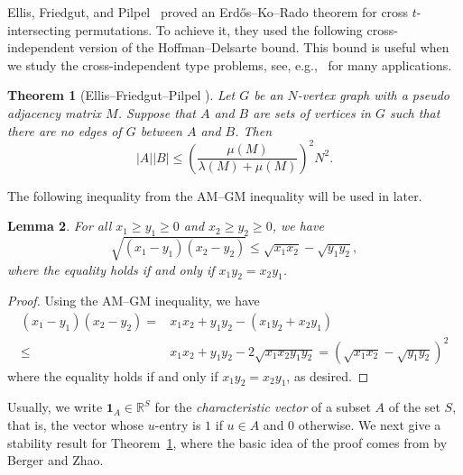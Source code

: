 \documentclass[11pt]{article}
\numberwithin{equation}{section}
\newtheorem{theorem}{Theorem}[section]
\newtheorem{lemma}[theorem]{Lemma}
\def\RR{\mathbb{R}}
\def\1{\mathbf{1}}
\begin{document}



Ellis, Friedgut, and Pilpel~\cite{EllisJAMS}
proved an Erd\H{o}s--Ko--Rado theorem for cross $t$-intersecting permutations.
To achieve it, they used the following cross-independent version of the Hoffman--Delsarte bound. %
This bound is useful when we study the cross-independent type problems,
see, e.g.,~\cite{Tokushige} for many applications.




\begin{theorem}[Ellis--Friedgut--Pilpel \cite{EllisJAMS}]\label{CrossHDbound}
Let $G$ be an $N$-vertex graph with a pseudo adjacency matrix $M$.
Suppose that $A$ and $B$ are sets of vertices in $G$ such
that there are no edges of $G$ between $A$ and $B$.
Then
$$ |A||B| \leq \left(\frac{\mu (M)}{\lambda (M)+\mu (M)}\right)^2N^2.$$
\end{theorem}



The following inequality from the AM--GM inequality will be used in later.

\begin{lemma}\label{specialAGinq}
For all $x_1\geq y_1\geq 0$ and $x_2\geq y_2\geq 0$, we have
$$\sqrt{(x_1-y_1)(x_2-y_2)}\leq \sqrt{x_1x_2}-\sqrt{y_1y_2},$$
where the equality holds if and only if $x_1y_2=x_2y_1$.
\end{lemma}
\begin{proof}
Using the AM--GM inequality, we have
\begin{align*}
(x_1-y_1)(x_2-y_2)=&x_1x_2 +y_1y_2- (x_1y_2+x_2 y_1)\\
\leq &x_1x_2 +y_1y_2-2\sqrt{x_1x_2y_1y_2}
= (\sqrt{x_1x_2}-\sqrt{y_1y_2})^2
\end{align*}
where the equality holds if and only if $x_1y_2=x_2y_1$, as desired.
\end{proof}



Usually, we write $\1_A\in \RR^S$ for the {\em characteristic vector} of a subset $A$  of the set $S$, that is, the vector whose $u$-entry is $1$ if $u\in A$ and $0$ otherwise.
We next give a stability result for Theorem~\ref{CrossHDbound}, where the basic idea of the proof comes from \cite[Lemma 2.1]{Berger} by Berger and Zhao.
\end{document}
